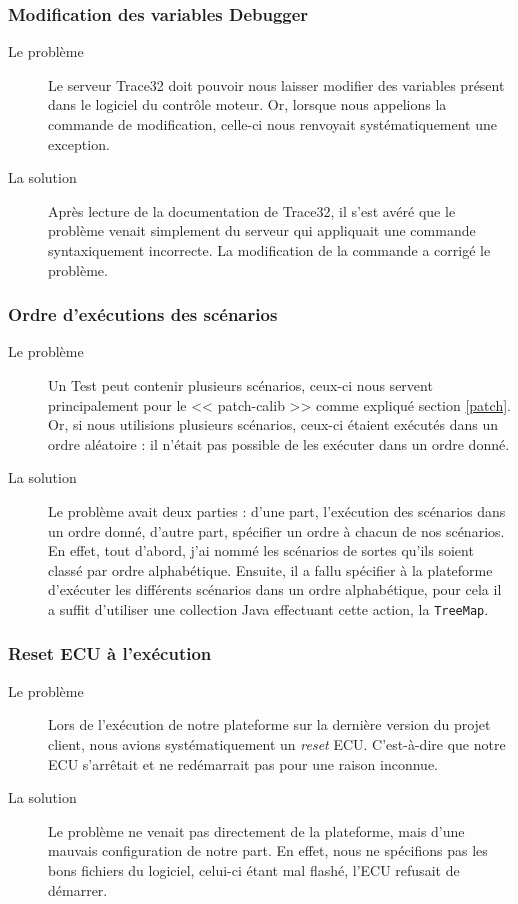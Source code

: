 	\subsubsection{Modification des variables Debugger}
		\begin{description}
			\item[Le problème] Le serveur Trace32 doit pouvoir nous laisser modifier des variables présent dans le logiciel du contrôle moteur. Or, lorsque nous appelions la commande de modification, celle-ci nous renvoyait systématiquement une exception.
			\item[La solution] Après lecture de la documentation de Trace32, il s'est avéré que le problème venait simplement du serveur qui appliquait une commande syntaxiquement incorrecte. La modification de la commande a corrigé le problème.
	\end{description}
	
	\subsubsection{Ordre d'exécutions des scénarios}
		\begin{description}
			\item[Le problème] Un Test peut contenir plusieurs scénarios, ceux-ci nous servent principalement pour le << patch-calib >> comme expliqué section \ref{patch}. Or, si nous utilisions plusieurs scénarios, ceux-ci étaient exécutés dans un ordre aléatoire : il n'était pas possible de les exécuter dans un ordre donné.
			\item[La solution] Le problème avait deux parties : d'une part, l'exécution des scénarios dans un ordre donné, d'autre part, spécifier un ordre à chacun de nos scénarios. En effet, tout d'abord, j'ai nommé les scénarios de sortes qu'ils soient classé par ordre alphabétique. Ensuite, il a fallu spécifier à la plateforme d'exécuter les différents scénarios dans un ordre alphabétique, pour cela il a suffit d'utiliser une collection Java effectuant cette action, la \texttt{TreeMap}.
	\end{description}
	
	\subsubsection{Reset ECU à l'exécution}
	\begin{description}
		\item[Le problème] Lors de l'exécution de notre plateforme sur la dernière version du projet client, nous avions systématiquement un \textit{reset} ECU. C'est-à-dire que notre ECU s'arrêtait et ne redémarrait pas pour une raison inconnue.
		\item[La solution] Le problème ne venait pas directement de la plateforme, mais d'une mauvais configuration de notre part. En effet, nous ne spécifions pas les bons fichiers du logiciel, celui-ci étant mal flashé, l'ECU refusait de démarrer.
	\end{description}
	
